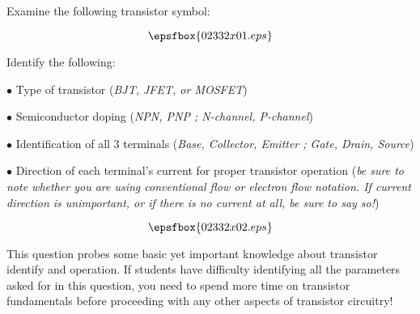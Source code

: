 

Examine the following transistor symbol:

$$\epsfbox{02332x01.eps}$$

\goodbreak

Identify the following:

\medskip
\item{$\bullet$} Type of transistor ({\it BJT, JFET, or MOSFET})
\item{$\bullet$} Semiconductor doping ({\it NPN, PNP ; N-channel, P-channel})
\item{$\bullet$} Identification of all 3 terminals ({\it Base, Collector, Emitter ; Gate, Drain, Source})
\item{$\bullet$} Direction of each terminal's current for proper transistor operation ({\it be sure to note whether you are using conventional flow or electron flow notation.  If current direction is unimportant, or if there is no current at all, be sure to say so!})
\medskip







$$\epsfbox{02332x02.eps}$$







This question probes some basic yet important knowledge about transistor identify and operation.  If students have difficulty identifying all the parameters asked for in this question, you need to spend more time on transistor fundamentals before proceeding with any other aspects of transistor circuitry!




